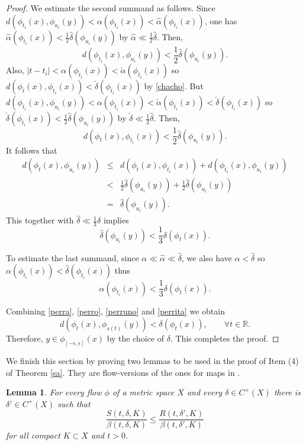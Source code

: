 \documentclass[11pt,letterpaper]{amsart}
\newtheorem{lemma}[thm]{Lemma}
\begin{document}
\begin{proof}
We estimate the second summand as follows.
Since $d(\phi_{t_i}(x),\phi_{u_i}(y))<\alpha(\phi_{t_i}(x))<\hat{\alpha}(\phi_{t_i}(x))$,
one has $\hat{\alpha}(\phi_{t_i}(x))<\frac{1}2\hat{\delta}(\phi_{u_i}(y))$
by $\hat{\alpha}\ll\frac{1}2\hat{\delta}$. Then,
$$
d(\phi_{t_i}(x),\phi_{u_i}(y))<\frac{1}2\hat{\delta}(\phi_{u_i}(y)).
$$
Also,
$|t-t_i|<\alpha(\phi_{t_i}(x))<\check{\alpha}(\phi_{t_i}(x))$ so
$
d(\phi_t(x),\phi_{t_i}(x))<\check{\delta}(\phi_{t_i}(x))
$
by \eqref{chacho}. But $d(\phi_{t_i}(x),\phi_{u_i}(y))<\alpha(\phi_{t_i}(x))<\check{\alpha}(\phi_{t_i}(x))<\check{\delta}(\phi_{t_i}(x))$ so
$\check{\delta}(\phi_{t_i}(x))<\frac{1}2\hat{\delta}(\phi_{u_i}(y))$ by $\check{\delta}\ll\frac{1}2\hat{\delta}$. Then,
$$
d(\phi_t(x),\phi_{t_i}(x))<\frac{1}2\hat{\delta}(\phi_{u_i}(y)).
$$
It follows that
\begin{eqnarray*}
d(\phi_t(x),\phi_{u_i}(y))&\leq& d(\phi_t(x),\phi_{t_i}(x))+d(\phi_{t_i}(x),\phi_{u_i}(y))\\
&<& \frac{1}2\hat{\delta}(\phi_{u_i}(y))+\frac{1}2\hat{\delta}(\phi_{u_i}(y))\\
&=& \hat{\delta}(\phi_{u_i}(y)).
\end{eqnarray*}
This together with $\hat{\delta}\ll\frac{1}3\delta$ implies
\begin{equation}
\label{perruno}
\hat{\delta}(\phi_{u_i}(y))<\frac{1}3\delta(\phi_t(x)).
\end{equation}

To estimate the last summand, since $\alpha\ll\hat{\alpha}\ll\hat{\delta}$, we also have
$\alpha<\hat{\delta}$ so
$\alpha(\phi_{t_i}(x))<\hat{\delta}(\phi_{t_i}(x))$ thus
\begin{equation}
\label{perrita}
\alpha(\phi_{t_i}(x))<\frac{1}3\delta(\phi_t(x)).
\end{equation}

Combining \eqref{perra}, \eqref{perro}, \eqref{perruno} and \eqref{perrita} we obtain
$$
d(\phi_t(x),\phi_{s(t)}(y))<\delta(\phi_t(x)),\quad\quad\forall 
t\in \mathbb{R}.
$$
Therefore, $y\in \phi_{[-\epsilon,\epsilon]}(x)$ by the choice of $\delta$.
This completes the proof.
\end{proof}




We finish this section by proving two lemmas to be used in the proof of Item (4) of Theorem \ref{sa}. They are flow-versions of the ones for maps in \cite{ylm}.


\begin{lemma}
\label{le2}
For every flow $\phi$ of a metric space $X$ and every $\delta\in C^+(X)$ there is $\delta'\in C^+(X)$ such that
\begin{equation}
\label{rado}
\frac{S(t,\delta,K)}{\beta(t,\delta,K)}\leq \frac{R(t,\delta',K)}{\beta(t,\delta',K)}
\end{equation}
for all compact $K\subset X$ and $t>0$.
\end{lemma}
\end{document}
